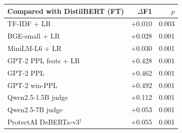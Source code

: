 \begin{tabular}{lrr}
\toprule
Compared with DistilBERT (FT) & $\Delta$F1 & $p$ \\
\midrule
TF-IDF + LR & +0.010 & 0.003 \\
BGE-small + LR & +0.028 & 0.001 \\
MiniLM-L6 + LR & +0.030 & 0.001 \\
GPT-2 PPL feats + LR & +0.428 & 0.001 \\
GPT-2 PPL & +0.462 & 0.001 \\
GPT-2 win-PPL & +0.492 & 0.001 \\
Qwen2.5-1.5B judge & +0.112 & 0.001 \\
Qwen2.5-7B judge & +0.053 & 0.001 \\
ProtectAI DeBERTa-v3$^\dagger$ & +0.055 & 0.001 \\
\bottomrule
\end{tabular}